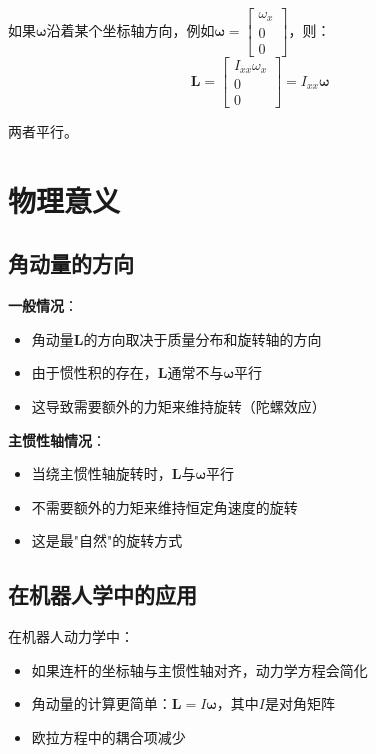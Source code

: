 \documentclass[12pt,a4paper]{article}
\begin{document}
如果$\bm{\omega}$沿着某个坐标轴方向，例如$\bm{\omega} = \begin{bmatrix} \omega_x \\ 0 \\ 0 \end{bmatrix}$，则：
\begin{equation}
\bm{L} = \begin{bmatrix}
I_{xx} \omega_x \\
0 \\
0
\end{bmatrix} = I_{xx} \bm{\omega}
\end{equation}

两者平行。

\section{物理意义}

\subsection{角动量的方向}

\textbf{一般情况}：
\begin{itemize}
\item 角动量$\bm{L}$的方向取决于质量分布和旋转轴的方向
\item 由于惯性积的存在，$\bm{L}$通常不与$\bm{\omega}$平行
\item 这导致需要额外的力矩来维持旋转（陀螺效应）
\end{itemize}

\textbf{主惯性轴情况}：
\begin{itemize}
\item 当绕主惯性轴旋转时，$\bm{L}$与$\bm{\omega}$平行
\item 不需要额外的力矩来维持恒定角速度的旋转
\item 这是最"自然"的旋转方式
\end{itemize}

\subsection{在机器人学中的应用}

在机器人动力学中：
\begin{itemize}
\item 如果连杆的坐标轴与主惯性轴对齐，动力学方程会简化
\item 角动量的计算更简单：$\bm{L} = I \bm{\omega}$，其中$I$是对角矩阵
\item 欧拉方程中的耦合项减少
\end{itemize}
\end{document}
